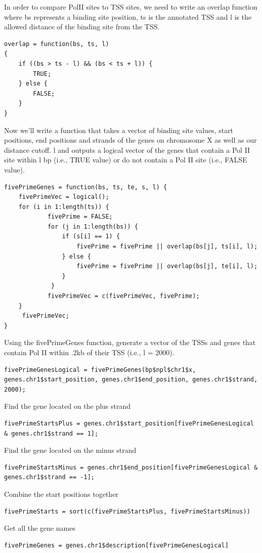 In order to compare PolII sites to TSS sites, we need to write an overlap function where bs represents a binding site position, ts is the annotated TSS and l is the allowed distance of the binding site from the TSS.
\begin{steps}
\begin{lstlisting}
overlap = function(bs, ts, l) 
{
    if ((bs > ts - l) && (bs < ts + l)) {
        TRUE;
    } else {
        FALSE;
    }
}
\end{lstlisting}
\end{steps}
Now we'll write a function that takes a vector of binding site values, start positions, end positions and strands of the genes on chromosome X as well as our distance cutoff. l and outputs a logical vector of the genes that contain a Pol II site within l bp (i.e., TRUE value) 
 or do not contain a Pol II site (i.e., FALSE value).
\begin{steps}
\begin{lstlisting} 
fivePrimeGenes = function(bs, ts, te, s, l) {
    fivePrimeVec = logical();
    for (i in 1:length(ts)) {
            fivePrime = FALSE;
            for (j in 1:length(bs)) {
                if (s[i] == 1) {
                    fivePrime = fivePrime || overlap(bs[j], ts[i], l);
                } else {
                    fivePrime = fivePrime || overlap(bs[j], te[i], l);
                }
             }
            fivePrimeVec = c(fivePrimeVec, fivePrime);
    }
     fivePrimeVec;
}
\end{lstlisting}
Using the fivePrimeGenes function, generate a vector of the TSSs and genes that contain Pol II within .2kb of their TSS (i.e., l = 2000).
\begin{lstlisting}
fivePrimeGenesLogical = fivePrimeGenes(bp$npl$chr1$x, genes.chr1$start_position, genes.chr1$end_position, genes.chr1$strand, 2000);
\end{lstlisting}

Find the gene located on the plus strand
\begin{lstlisting} 
fivePrimeStartsPlus = genes.chr1$start_position[fivePrimeGenesLogical & genes.chr1$strand == 1];
\end{lstlisting}
 Find the gene located on the minus strand
\begin{lstlisting}  
fivePrimeStartsMinus = genes.chr1$end_position[fivePrimeGenesLogical & genes.chr1$strand == -1];
\end{lstlisting}
Combine the start positions together
\begin{lstlisting}  
fivePrimeStarts = sort(c(fivePrimeStartsPlus, fivePrimeStartsMinus))
\end{lstlisting}
Get all the gene names
\begin{lstlisting}  
fivePrimeGenes = genes.chr1$description[fivePrimeGenesLogical]
\end{lstlisting}
\end{steps}




